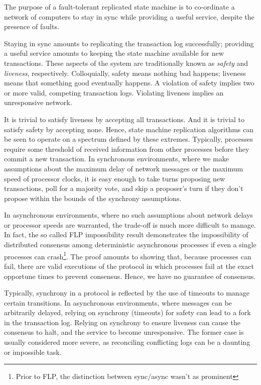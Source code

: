 The purpose of a fault-tolerant replicated state machine is to co-ordinate 
a network of computers to stay in sync while providing a useful service, 
despite the presence of faults.

Staying in sync amounts to replicating the transaction log successfully; 
providing a useful service amounts to keeping the state machine available for new transactions.
These aspects of the system are traditionally known as \emph{safety} and \emph{liveness}, respectively.
Colloquially, safety means nothing bad happens; liveness means that something good eventually happens.
A violation of safety implies two or more valid, competing transaction logs.
Violating liveness implies an unresponsive network.

It is trivial to satisfy liveness by accepting all transactions. And it is trivial to satisfy safety by accepting none.
Hence, state machine replication algorithms can be seen to operate on a spectrum defined by these extremes.
Typically, processes require some threshold of received information from other processes before they commit a new transaction.
In synchronous environments, 
where we make assumptions about the maximum delay of network messages or the maximum speed of processor clocks,
 it is easy enough to take turns proposing new transactions, poll for a majority vote, 
and skip a proposer's turn if they don't propose within the bounds of the synchrony assumptions.

In asynchronous environments, where no such assumptions about network delays or processor speeds are warranted,
the trade-off is much more difficult to manage.
In fact, the so called FLP impossibility result demonstrates the 
impossibility of distributed consensus among deterministic asynchronous processes 
if even a single processes can crash\footnote{Prior to FLP, the distinction between sync/async wasn't as prominent}\cite{flp}.
The proof amounts to showing that, because processes can fail, 
there are valid executions of the protocol in which processes fail at the exact opportune times to prevent consensus.
Hence, we have no guarantee of consensus.

Typically, synchrony in a protocol is reflected by the use of timeouts to manage certain transitions.
In asynchronous environments, where messages can be arbitrarily delayed, relying on synchrony (timeouts) for safety
can lead to a fork in the transaction log.
Relying on synchrony to ensure liveness can cause the consensus to halt, and the service to become unresponsive.
The former case is usually considered more severe, as reconciling conflicting logs can be a daunting or impossible task. 

